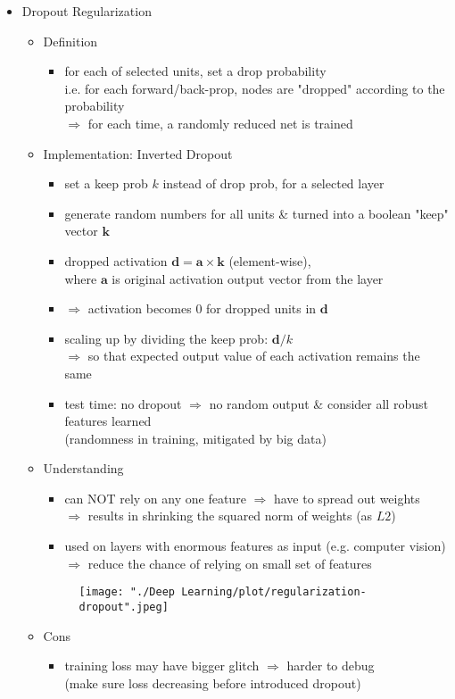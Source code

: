 \begin{itemize}
\item Dropout Regularization
	\begin{itemize}
	\item Definition
		\begin{itemize}
		\item for each of selected units, set a drop probability \\
		i.e. for each forward/back-prop, nodes are "dropped" according to the probability \\
		$\Rightarrow$ for each time, a randomly reduced net is trained
		\end{itemize}
	\item Implementation: Inverted Dropout
		\begin{itemize}
		\item set a keep prob $k$ instead of drop prob, for a selected layer
		\item generate random numbers for all units \& turned into a boolean "keep" vector $\mathbf k$
		\item dropped activation $\mathbf d = \mathbf a \times \mathbf k$ (element-wise), \\
		 where $\mathbf a$ is original activation output vector from the layer
		\item $\Rightarrow$ activation becomes $0$ for dropped units in $\mathbf d$
		\item scaling up by dividing the keep prob: $\mathbf d / k$ \\
		$\Rightarrow$ so that expected output value of each activation remains the same
		\item test time: no dropout $\Rightarrow$ no random output \& consider all robust features learned\\
		(randomness in training, mitigated by big data)
		\end{itemize}
	\item Understanding
		\begin{itemize}
		\item can NOT rely on any one feature $\Rightarrow$ have to spread out weights \\
		$\Rightarrow$ results in shrinking the squared norm of weights (as $L2$)
		\item used on layers with enormous features as input (e.g. computer vision) \\
		$\Rightarrow$ reduce the chance of relying on small set of features
		\end{itemize}
	\begin{figure}[ht]
	\texttt{[image: "./Deep Learning/plot/regularization-dropout".jpeg]}
	\end{figure}
	\item Cons
		\begin{itemize}
		\item training loss may have bigger glitch $\Rightarrow$ harder to debug \\
		(make sure loss decreasing before introduced dropout)
		\end{itemize}
	\end{itemize}


\end{itemize}

